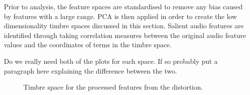		Prior to analysis, the feature spaces are standardised to remove any bias caused by features with a large
		range. PCA is then applied in order to create the low dimensionality timbre spaces discussed in this
		section. Salient audio features are identified through taking correlation measures between the original
		audio feature values and the coordinates of terms in the timbre space.

		\note
		{
			Do we really need both of the plots for each space. If so probably put a paragraph here explaining
			the difference between the two.
		}

		\begin{figure}[h!]
			\centering
			\qquad
			\caption{Timbre space for the processed features from the distortion.}
			\label{fig:DistortionProcessedPCAs}
		\end{figure}

